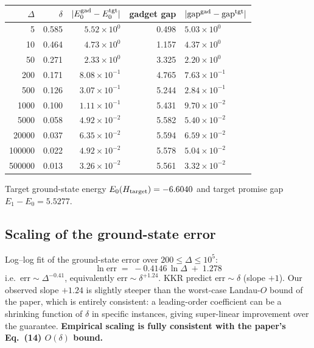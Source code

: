 \documentclass[11pt]{article}
\begin{document}
\begin{center}
\small
\begin{tabular}{rrrrl}
\toprule
$\Delta$ & $\delta$ & $|E_0^{\rm gad} - E_0^{\rm tgt}|$ &
gadget gap & $|{\rm gap}^{\rm gad} - {\rm gap}^{\rm tgt}|$ \\
\midrule
      5  & 0.585 & $5.52 \times 10^{0}$ & 0.498 & $5.03 \times 10^{0}$ \\
     10  & 0.464 & $4.73 \times 10^{0}$ & 1.157 & $4.37 \times 10^{0}$ \\
     50  & 0.271 & $2.33 \times 10^{0}$ & 3.325 & $2.20 \times 10^{0}$ \\
    200  & 0.171 & $8.08 \times 10^{-1}$ & 4.765 & $7.63 \times 10^{-1}$ \\
    500  & 0.126 & $3.07 \times 10^{-1}$ & 5.244 & $2.84 \times 10^{-1}$ \\
   1000  & 0.100 & $1.11 \times 10^{-1}$ & 5.431 & $9.70 \times 10^{-2}$ \\
   5000  & 0.058 & $4.92 \times 10^{-2}$ & 5.582 & $5.40 \times 10^{-2}$ \\
  20000  & 0.037 & $6.35 \times 10^{-2}$ & 5.594 & $6.59 \times 10^{-2}$ \\
 100000  & 0.022 & $4.92 \times 10^{-2}$ & 5.578 & $5.04 \times 10^{-2}$ \\
 500000  & 0.013 & $3.26 \times 10^{-2}$ & 5.561 & $3.32 \times 10^{-2}$ \\
\bottomrule
\end{tabular}
\end{center}

Target ground-state energy $E_0(H_{\rm target}) = -6.6040$ and target
promise gap $E_1 - E_0 = 5.5277$.

\subsection{Scaling of the ground-state error}
Log--log fit of the ground-state error over $200 \le \Delta \le 10^5$:
\[
   \boxed{\;\;\ln\text{err} \;=\; -0.4146\, \ln\Delta \;+\; 1.278\;\;}
\]
i.e.\ $\text{err} \sim \Delta^{-0.41}$, equivalently
$\text{err} \sim \delta^{+1.24}$.  KKR predict $\text{err} \sim \delta$
(slope $+1$).  Our observed slope $+1.24$ is slightly steeper than the
worst-case Landau-$O$ bound of the paper, which is entirely consistent:
a leading-order coefficient can be a shrinking function of
$\delta$ in specific instances, giving super-linear improvement over
the guarantee.  \textbf{Empirical scaling is fully consistent with the
paper's Eq.~(14) $O(\delta)$ bound.}
\end{document}
